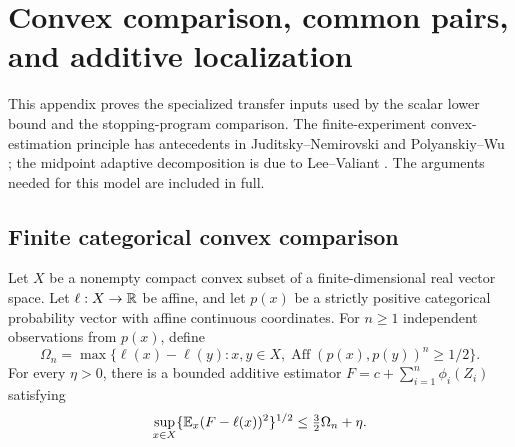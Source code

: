 \section{Convex comparison, common pairs, and additive localization}
\label{sec:transfer-foundations}

This appendix proves the specialized transfer inputs used by the scalar
lower bound and the stopping-program comparison. The finite-experiment
convex-estimation principle has antecedents in
Juditsky--Nemirovski and Polyanskiy--Wu \cite{jn,pw};
the midpoint adaptive decomposition is due to Lee--Valiant \cite{lv}.
The arguments needed for this model are included in full.

\subsection{Finite categorical convex comparison}

\begin{lemma}
\label{lem:finite-comparison}
Let $X$ be a nonempty compact convex subset of a finite-dimensional real vector
space. Let $\ell:X\to\mathbb R$ be affine, and let $p(x)$ be a strictly positive
categorical probability vector with affine continuous coordinates. For $n\ge1$
independent observations from $p(x)$, define
\[
 \Omega_n=\max\{\ell(x)-\ell(y):x,y\in X,
                  \operatorname{Aff}(p(x),p(y))^n\ge1/2\}.
\]
For every $\eta>0$, there is a bounded additive estimator
$F=c+\sum_{i=1}^n\phi_i(Z_i)$ satisfying
\begin{equation}
 \sup_{x\in X}\{\mathbb E_x(F-\ell(x))^2\}^{1/2}
 \le\tfrac32\Omega_n+\eta.
 \label{eq:finite-comparison}
\end{equation}
\end{lemma}


